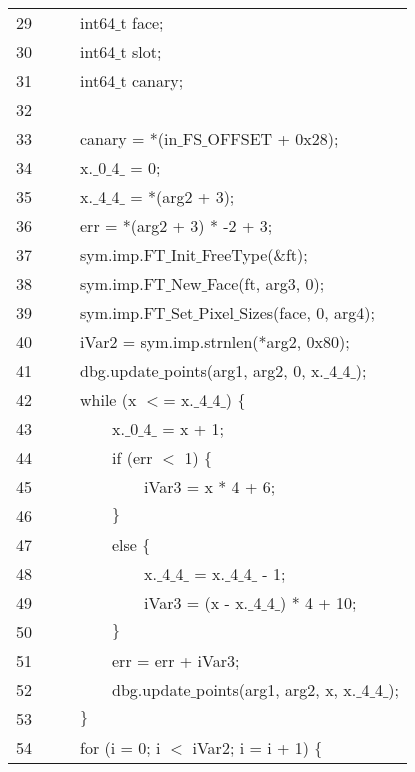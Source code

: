 \documentclass{report}
\newcommand{\tab}{$\quad$}
\newcommand{\csfont}[1]{\fontfamily{cmtt}\selectfont #1}
\begin{document}
\begin{tabular}{c|l}
  29 & {\csfont{\tab \tab int64$\_$t face;}} \\
  30 & {\csfont{\tab \tab int64$\_$t slot;}} \\
  31 & {\csfont{\tab \tab int64$\_$t canary;}} \\
  32 & {\csfont{\tab \tab }} \\
  33 & {\csfont{\tab \tab canary = *(in$\_$FS$\_$OFFSET + 0x28);}} \\
  34 & {\csfont{\tab \tab x.$\_$0$\_$4$\_$ = 0;}} \\
  35 & {\csfont{\tab \tab x.$\_$4$\_$4$\_$ = *(arg2 + 3);}} \\
  36 & {\csfont{\tab \tab err = *(arg2 + 3) * -2 + 3;}} \\
  37 & {\csfont{\tab \tab sym.imp.FT$\_$Init$\_$FreeType($\&$ft);}} \\
  38 & {\csfont{\tab \tab sym.imp.FT$\_$New$\_$Face(ft, arg3, 0);}} \\
  39 & {\csfont{\tab \tab sym.imp.FT$\_$Set$\_$Pixel$\_$Sizes(face, 0, arg4);}} \\
  40 & {\csfont{\tab \tab iVar2 = sym.imp.strnlen(*arg2, 0x80);}} \\
  41 & {\csfont{\tab \tab dbg.update$\_$points(arg1, arg2, 0, x.$\_$4$\_$4$\_$);}} \\
  42 & {\csfont{\tab \tab while (x $<$= x.$\_$4$\_$4$\_$) $\{$}} \\
  43 & {\csfont{\tab \tab \tab \tab x.$\_$0$\_$4$\_$ = x + 1;}} \\
  44 & {\csfont{\tab \tab \tab \tab if (err $<$ 1) $\{$}} \\
  45 & {\csfont{\tab \tab \tab \tab \tab \tab iVar3 = x * 4 + 6;}} \\
  46 & {\csfont{\tab \tab \tab \tab $\}$}} \\
  47 & {\csfont{\tab \tab \tab \tab else $\{$}} \\
  48 & {\csfont{\tab \tab \tab \tab \tab \tab x.$\_$4$\_$4$\_$ = x.$\_$4$\_$4$\_$ - 1;}} \\
  49 & {\csfont{\tab \tab \tab \tab \tab \tab iVar3 = (x - x.$\_$4$\_$4$\_$) * 4 + 10;}} \\
  50 & {\csfont{\tab \tab \tab \tab $\}$}} \\
  51 & {\csfont{\tab \tab \tab \tab err = err + iVar3;}} \\
  52 & {\csfont{\tab \tab \tab \tab dbg.update$\_$points(arg1, arg2, x, x.$\_$4$\_$4$\_$);}} \\
  53 & {\csfont{\tab \tab $\}$}} \\
  54 & {\csfont{\tab \tab for (i = 0; i $<$ iVar2; i = i + 1) $\{$}} \\

\end{tabular}
\end{document}
